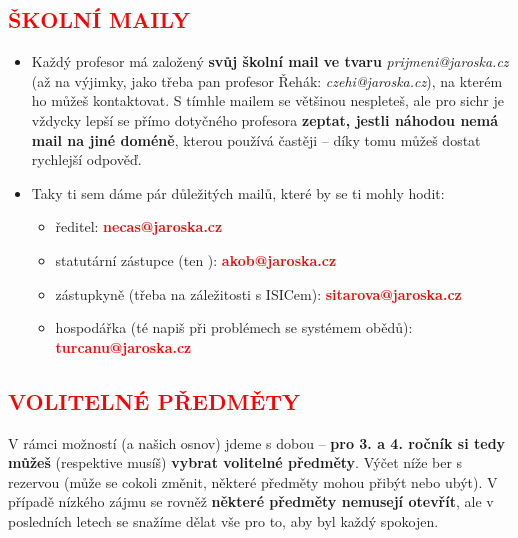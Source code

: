 \documentclass{article}
\newcommand{\podnadpis}[1]{
  \subsection*{\textcolor{red}{#1}}
}
\begin{document}
\podnadpis{ŠKOLNÍ MAILY}
\begin{itemize}[leftmargin=10pt]
  \item Každý profesor má založený \textbf{svůj školní mail ve tvaru} \textit{prijmeni@jaroska.cz} (až na výjimky, jako třeba pan profesor Řehák: \textit{czehi@jaroska.cz}), na kterém ho můžeš kontaktovat. S tímhle mailem se většinou nespleteš, ale pro sichr je vždycky lepší se přímo dotyčného profesora \textbf{zeptat, jestli náhodou nemá mail na jiné doméně}, kterou používá častěji -- díky tomu můžeš dostat rychlejší odpověď.
  \item  Taky ti sem dáme pár důležitých mailů, které by se ti mohly hodit:
  \begin{itemize}[leftmargin=0pt]
    \item  ředitel: \textcolor{red}{\textbf{necas@jaroska.cz}}
    \item statutární zástupce (ten ): \textcolor{red}{\textbf{akob@jaroska.cz}}
    \item zástupkyně (třeba na záležitosti s ISICem): \textcolor{red}{\textbf{sitarova@jaroska.cz}}
    \item  hospodářka (té napiš při problémech se systémem obědů): \textcolor{red}{\textbf{turcanu@jaroska.cz}}
  \end{itemize}
\end{itemize}

\newpage

\podnadpis{VOLITELNÉ PŘEDMĚTY}

\noindent V rámci možností (a našich osnov) jdeme s dobou -- \textbf{pro 3. a 4. ročník si tedy
můžeš} (respektive musíš) \textbf{vybrat volitelné předměty}. Výčet níže ber s rezervou
(může se cokoli změnit, některé předměty mohou přibýt nebo ubýt). V případě
nízkého zájmu se rovněž \textbf{některé předměty nemusejí otevřít}, ale v posledních
letech se snažíme dělat vše pro to, aby byl každý spokojen.
\end{document}
